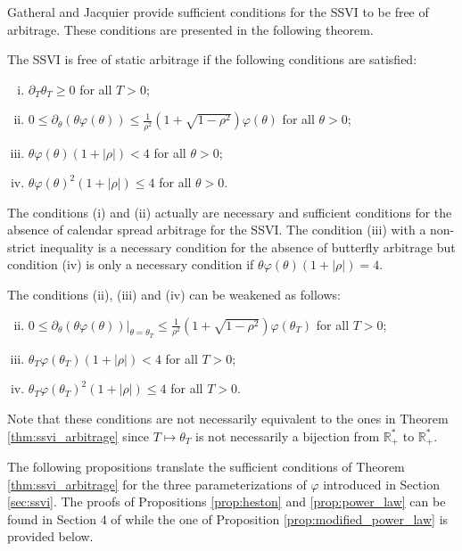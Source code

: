 Gatheral and Jacquier provide sufficient conditions for the SSVI to be free of arbitrage. These conditions are presented in the following theorem. 
\begin{theorem}
The SSVI is free of static arbitrage if the following conditions are satisfied:
\begin{enumerate}[(i)]
    \item $\partial_T \theta_T \ge 0$ for all $T>0$;
    \item $0\le \partial_{\theta}(\theta \varphi(\theta)) \le \frac{1}{\rho^2}\left(1+\sqrt{1-\rho^2} \right)\varphi(\theta)$ for all $\theta >0$;
    \item $\theta \varphi(\theta)(1+|\rho|)< 4$ for all $\theta >0$;
    \item $\theta\varphi(\theta)^2(1+|\rho|) \le 4$ for all $\theta >0$.
\end{enumerate}
\label{thm:ssvi_arbitrage}
\end{theorem}
\begin{remark}
    The conditions (i) and (ii) actually are necessary and sufficient conditions for the absence of calendar spread arbitrage for the SSVI. The condition (iii) with a non-strict inequality is a necessary condition for the absence of butterfly arbitrage but condition (iv) is only a necessary condition if $\theta \varphi(\theta)(1+|\rho|) = 4$. 
\end{remark}
\begin{remark}\label{rk:ssvi_weak_conditions}
    The conditions (ii), (iii) and (iv) can be weakened as follows:
    \begin{enumerate}[(i)]
        \setcounter{enumi}{1}
        \item $0\le \partial_{\theta}(\theta \varphi(\theta))\rvert_{\theta=\theta_T} \le \frac{1}{\rho^2}\left(1+\sqrt{1-\rho^2} \right)\varphi(\theta_T)$ for all $T >0$;
        \item $\theta_T \varphi(\theta_T)(1+|\rho|)< 4$ for all $T >0$;
        \item $\theta_T\varphi(\theta_T)^2(1+|\rho|) \le 4$ for all $T >0$.
    \end{enumerate}
    Note that these conditions are not necessarily equivalent to the ones in Theorem \ref{thm:ssvi_arbitrage} since $T\mapsto \theta_T$ is not necessarily a bijection from $\mathbb{R}_+^*$ to $\mathbb{R}_+^*$. 
\end{remark}
 The following propositions translate the sufficient conditions of Theorem \ref{thm:ssvi_arbitrage} for the three parameterizations of $\varphi$ introduced in Section \ref{sec:ssvi}. The proofs of Propositions \ref{prop:heston} and \ref{prop:power_law} can be found in Section 4 of \cite{gatheral2014arbitrage} while the one of Proposition \ref{prop:modified_power_law} is provided below. 
